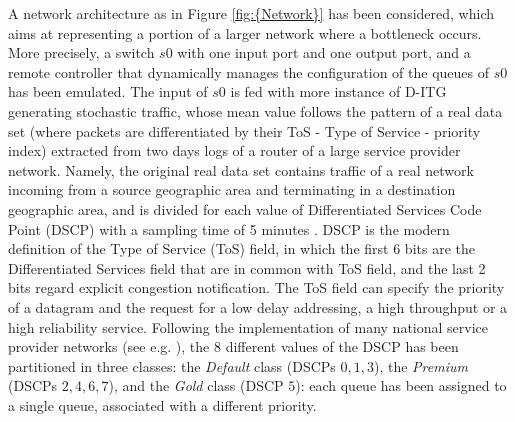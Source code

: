 A network architecture as in Figure \ref{fig:{Network}} has been considered, which aims at representing a portion of a larger network where a bottleneck occurs. More precisely, a switch $s0$ with one input port and one output port, and a remote controller \cite{OVS, RYU} that dynamically manages the configuration of the queues of $s0$ has been emulated. The input of $s0$ is fed with more instance of D-ITG generating stochastic traffic, whose mean value follows the pattern of a real data set (where packets are differentiated by their ToS - Type of Service - priority index) extracted from two days logs of a router of a large service provider network. Namely, the original real data set contains traffic of a real network incoming from a source geographic area and terminating in a destination geographic area, and is divided for each value of Differentiated Services Code Point (DSCP) with a sampling time of 5 minutes \cite{Baker1998, Babiarz2006}. DSCP is the modern definition of the Type of Service (ToS) field, in which the first 6 bits are the Differentiated Services field that are in common with ToS field, and the last 2 bits regard explicit congestion notification. The ToS field can specify the priority of a datagram and the request for a low delay addressing, a high throughput or a high reliability service. Following the implementation of many national service provider networks (see e.g. \cite{Notiziario}), the 8 different values of the DSCP has been partitioned in three classes: the \textit{Default} class (DSCPs $0,1,3$), the \textit{Premium} (DSCPs $2,4,6,7$), and the \textit{Gold} class (DSCP $5$): each queue has been assigned to a single queue, associated with a different priority.



